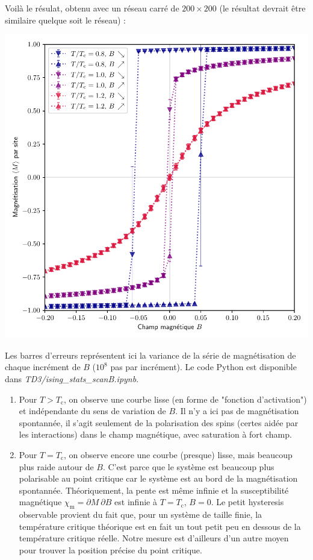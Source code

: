 \documentclass{book}
\def\filename{\emph}
\begin{document}
\begin{correction}
Voilà le résulat, obtenu avec un réseau carré de $200 \times 200$ (le résultat devrait être similaire quelque soit le réseau) :
\begin{center}
\includegraphics[width=0.75\linewidth]{TD3/ising_stats_scanB_updown_200x200_3T.pdf}
\end{center}
Les barres d'erreurs représentent ici la variance de la série de magnétisation de chaque incrément de $B$ ($10^8$ pas par incrément). Le code Python est disponible dans \filename{TD3/ising\_stats\_scanB.ipynb}.
\begin{enumerate}
\item Pour $T>T_\text{c}$, on observe une courbe lisse (en forme de "fonction d'activation") et indépendante du sens de variation de $B$. Il n'y a ici pas de magnétisation spontannée, il s'agit seulement de la polarisation des spins (certes aidée par les interactions) dans le champ magnétique, avec saturation à fort champ.
\item Pour $T=T_\text{c}$, on observe encore une courbe (presque) lisse, mais beaucoup plus raide autour de $B$. C'est parce que le système est beaucoup plus polarisable au point critique car le système est au bord de la magnétisation spontannée. Théoriquement, la pente est même infinie et la susceptibilité magnétique $\chi_\text{m}=\partial M \ \partial B$ est infinie à $T=T_\text{c}$, $B=0$. Le petit hysteresis observable provient du fait que, pour un système de taille finie, la température critique théorique est en fait un tout petit peu en dessous de la température critique réelle. Notre mesure est d'ailleurs d'un autre moyen pour trouver la position précise du point critique.

\end{enumerate}
\end{correction}
\end{document}
